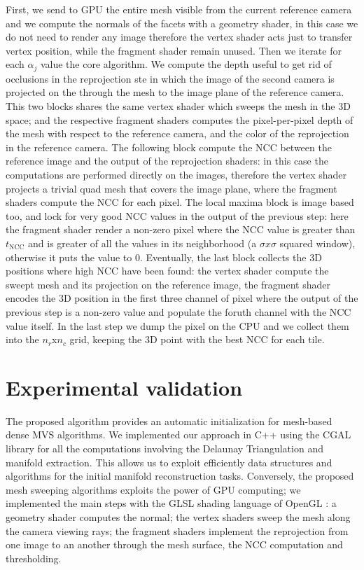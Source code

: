 First, we send to GPU the entire mesh visible from the current reference camera and we compute the normals of the facets with a geometry shader, in this case we do not need to render any image therefore the vertex shader acts just to transfer vertex position, while the fragment shader remain unused.
Then we iterate for each $\alpha_j$ value the core algorithm. 
We compute the depth useful to get rid of occlusions in the reprojection ste in which the image of the second camera is projected on the through the mesh to the image plane of the reference camera. 
This two blocks shares the same vertex shader which sweeps the mesh in the 3D space; and the respective fragment shaders computes the pixel-per-pixel depth of the mesh with respect to the reference camera, and the color of the reprojection in the reference camera.
The following block compute the NCC between the reference image and the output of the reprojection shaders: in this case the computations are performed directly on the images, therefore the vertex shader projects a trivial quad mesh that covers the image plane, where the fragment shaders compute the NCC for each pixel.
The local maxima block is image based too, and lock for very good NCC values in the output of the previous step: here the fragment shader render a non-zero pixel where the NCC value is greater than $t_{\text{NCC}}$ and is greater of all the values in its neighborhood (a $\sigma x \sigma$ squared window), otherwise it puts the value to $0$.
Eventually, the last block collects the 3D positions where high NCC have been found: the vertex shader compute the sweept mesh and its projection on the reference image, the fragment shader encodes the 3D position in the first three channel of pixel where the output of the previous step is a non-zero value and populate the foruth channel with the NCC value itself.
In the last step we dump the pixel on the CPU and we collect them into the $n_r$x$n_c$ grid, keeping the 3D point with the best NCC for each tile.



\section{Experimental validation}
The proposed algorithm provides an automatic initialization for mesh-based dense MVS algorithms.
We implemented our approach in C++ using the CGAL library \cite{cgal} for all the computations involving the Delaunay Triangulation and manifold extraction. This allows us to exploit efficiently data structures and algorithms for the initial manifold reconstruction tasks.
Conversely, the proposed mesh sweeping algorithms exploits the power of GPU computing; we implemented the main steps with the GLSL shading language of OpenGL \cite{opengl}: a geometry shader computes the normal; the vertex shaders sweep the mesh along the camera viewing rays; the fragment shaders implement the reprojection from one image to an another through the mesh surface, the NCC computation and thresholding.


